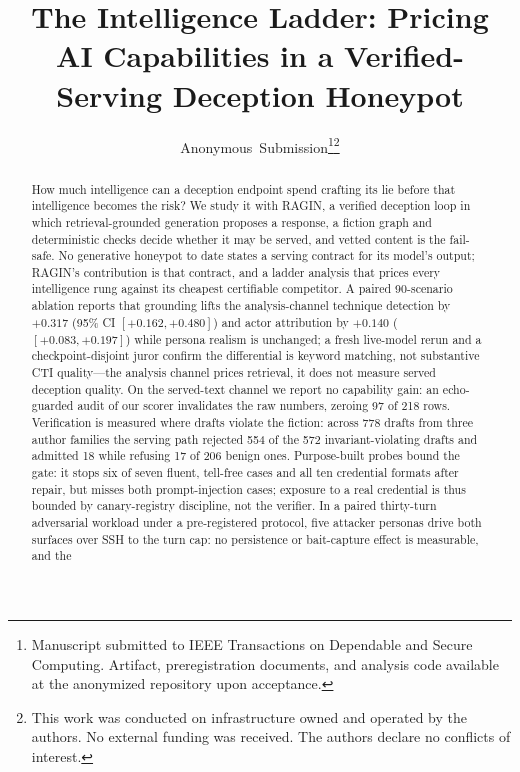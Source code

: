 \documentclass[journal,compsoc]{IEEEtran}
\begin{document}
\title{The Intelligence Ladder: Pricing AI Capabilities in a Verified-Serving Deception Honeypot}
\author{Anonymous~Submission\thanks{Manuscript submitted to IEEE Transactions on Dependable and Secure Computing. Artifact, preregistration documents, and analysis code available at the anonymized repository upon acceptance.}\thanks{This work was conducted on infrastructure owned and operated by the authors. No external funding was received. The authors declare no conflicts of interest.}}
\maketitle

\begin{abstract}
How much intelligence can a deception endpoint spend crafting its lie before
that intelligence becomes the risk? We
study it with RAGIN, a verified deception loop in which retrieval-grounded
generation proposes a response, a fiction graph and deterministic checks
decide whether it may be served, and vetted content is the fail-safe. No
generative honeypot to date states a serving contract for its model's
output; RAGIN's contribution is that contract, and a ladder analysis that
prices every intelligence rung against its cheapest certifiable
competitor. A paired
90-scenario ablation reports that grounding lifts the analysis-channel
technique detection by $+0.317$ (95\% CI $[+0.162,+0.480]$) and actor
attribution by $+0.140$ ($[+0.083,+0.197]$) while persona realism is
unchanged; a fresh live-model rerun and a checkpoint-disjoint juror
confirm the differential is keyword matching, not substantive CTI
quality---the analysis channel prices retrieval, it does not measure
served deception quality.
On the served-text channel we report no capability gain: an echo-guarded audit
of our scorer invalidates the raw numbers, zeroing 97 of 218 rows. Verification
is measured where drafts violate the fiction: across 778 drafts from three
author families the serving path rejected 554 of the 572 invariant-violating
drafts and admitted 18 while refusing 17 of 206 benign ones. Purpose-built probes bound
the gate: it stops six of seven fluent, tell-free cases and all ten credential
formats after repair, but misses both prompt-injection cases; exposure to a real
credential is thus bounded by canary-registry discipline, not the verifier. In a paired thirty-turn adversarial workload under a pre-registered
protocol, five attacker personas drive both surfaces over SSH to the
turn cap: no persistence or bait-capture effect is measurable, and the

\end{abstract}
\end{document}

